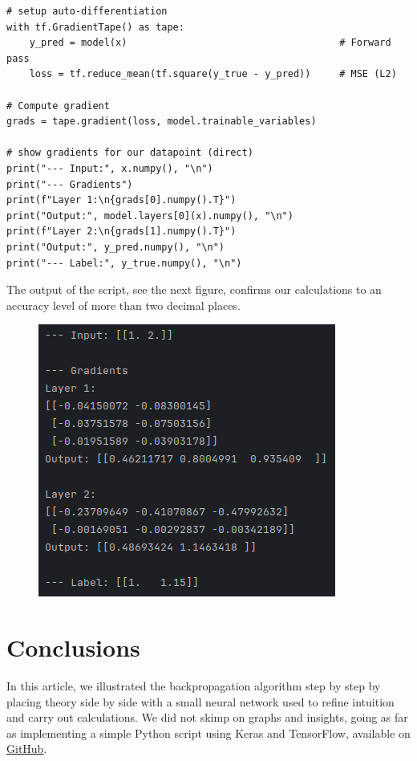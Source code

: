 \documentclass{article}
\begin{document}
\begin{tcolorbox}[colback=gray!10, colframe=gray!50, title=Gradient calculation]
\begin{verbatim}
# setup auto-differentiation
with tf.GradientTape() as tape:
    y_pred = model(x)                                     # Forward pass
    loss = tf.reduce_mean(tf.square(y_true - y_pred))     # MSE (L2)

# Compute gradient
grads = tape.gradient(loss, model.trainable_variables)

# show gradients for our datapoint (direct)
print("--- Input:", x.numpy(), "\n")
print("--- Gradients")
print(f"Layer 1:\n{grads[0].numpy().T}")
print("Output:", model.layers[0](x).numpy(), "\n")
print(f"Layer 2:\n{grads[1].numpy().T}")
print("Output:", y_pred.numpy(), "\n")
print("--- Label:", y_true.numpy(), "\n")
\end{verbatim}
\end{tcolorbox}

 The output of the script, see the next figure, confirms our calculations to an accuracy level of more than two decimal places.

\begin{figure}[H]
    \centering
    \includegraphics[width=0.5\linewidth]{images/output.png}

\end{figure}

\section{Conclusions}

In this article, we illustrated the backpropagation algorithm step by step by placing theory side by side with a small neural network used to refine intuition and carry out calculations. We did not skimp on graphs and insights, going as far as implementing a simple Python script using Keras and TensorFlow, available on \href{github.com/nicolinux72/backpropagation.git}{GitHub}.

\nocite{*}
\printbibliography
\end{document}
